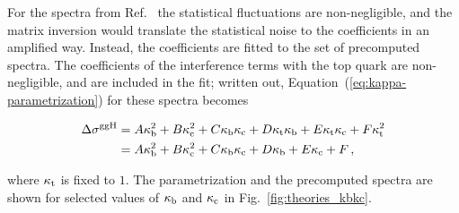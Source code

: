 For the spectra from Ref.~\cite{Bishara:2016jga} the statistical fluctuations are non-negligible, and the matrix inversion would translate the statistical noise to the coefficients in an amplified way.
% 
Instead, the coefficients are fitted to the set of precomputed spectra.
% 
The coefficients of the interference terms with the top quark are non-negligible, and are included in the fit; written out, Equation~(\ref{eq:kappa-parametrization}) for these spectra becomes
% 
\begin{linenomath*}
\begin{equation}
\begin{split}
\Delta\sigma^{\mathrm{g}\mathrm{g}\mathrm{H}}
  & = A \kappa_{\mathrm{b}}^2 + B \kappa_{\mathrm{c}}^2 + C \kappa_{\mathrm{b}} \kappa_{\mathrm{c}}
    + D \kappa_{\mathrm{t}} \kappa_{\mathrm{b}} + E \kappa_{\mathrm{t}} \kappa_{\mathrm{c}} + F \kappa_{\mathrm{t}}^2
  \\
  & = A \kappa_{\mathrm{b}}^2 + B \kappa_{\mathrm{c}}^2 + C \kappa_{\mathrm{b}} \kappa_{\mathrm{c}}
    + D \kappa_{\mathrm{b}} + E \kappa_{\mathrm{c}} + F
  \,,
\end{split}
\end{equation}
\end{linenomath*}
% 
where $\kappa_{\mathrm{t}}$ is fixed to $1$.
% 
The parametrization and the precomputed spectra are shown for selected values of $\kappa_{\mathrm{b}}$ and $\kappa_{\mathrm{c}}$ in Fig.~\ref{fig:theories_kbkc}.


